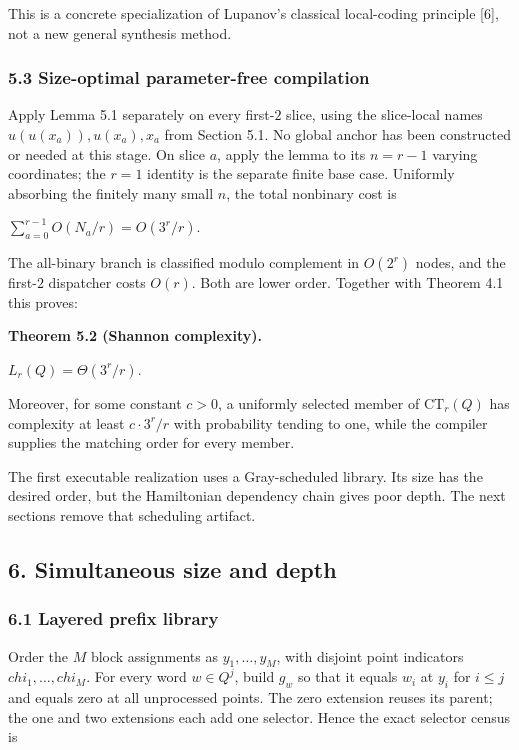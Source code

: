 \documentclass[
  11pt,
]{article}
\theoremstyle{definition}
\theoremstyle{remark}
\begin{document}
This is a concrete specialization of Lupanov's classical local-coding
principle {[}6{]}, not a new general synthesis method.

\hypertarget{size-optimal-parameter-free-compilation}{%
\subsubsection{5.3 Size-optimal parameter-free
compilation}\label{size-optimal-parameter-free-compilation}}

Apply Lemma 5.1 separately on every first-\(2\) slice, using the
slice-local names \(u(u(x_a)),u(x_a),x_a\) from Section 5.1. No global
anchor has been constructed or needed at this stage. On slice \(a\),
apply the lemma to its \(n=r-1\) varying coordinates; the \(r=1\)
identity is the separate finite base case. Uniformly absorbing the
finitely many small \(n\), the total nonbinary cost is

\(\sum_{a=0}^{r-1} O(N_a/r) = O(3^r/r)\).

The all-binary branch is classified modulo complement in \(O(2^r)\)
nodes, and the first-\(2\) dispatcher costs \(O(r)\). Both are lower
order. Together with Theorem 4.1 this proves:

\textbf{Theorem 5.2 (Shannon complexity).}

\(L_r(Q)=\Theta(3^r/r)\).

Moreover, for some constant \(c>0\), a uniformly selected member of
\(\mathrm{CT}_r(Q)\) has complexity at least \(c\mathbin{\cdot}3^r/r\)
with probability tending to one, while the compiler supplies the
matching order for every member.

The first executable realization uses a Gray-scheduled library. Its size
has the desired order, but the Hamiltonian dependency chain gives poor
depth. The next sections remove that scheduling artifact.

\hypertarget{simultaneous-size-and-depth}{%
\subsection{6. Simultaneous size and
depth}\label{simultaneous-size-and-depth}}

\hypertarget{layered-prefix-library}{%
\subsubsection{6.1 Layered prefix
library}\label{layered-prefix-library}}

Order the \(M\) block assignments as \(y_1,\ldots ,y_M\), with disjoint
point indicators \(chi_1,\ldots ,chi_M\). For every word \(w \in Q^j\),
build \(g_w\) so that it equals \(w_i\) at \(y_i\) for \(i\le j\) and
equals zero at all unprocessed points. The zero extension reuses its
parent; the one and two extensions each add one selector. Hence the
exact selector census is
\end{document}
